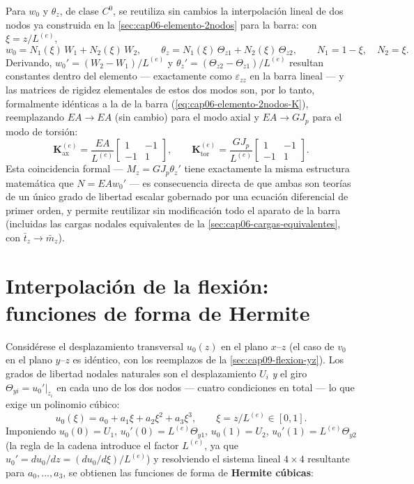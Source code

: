 Para $w_0$ y $\theta_z$, de clase $C^0$, se reutiliza sin cambios la interpolación lineal de dos nodos ya construida en la \cref{sec:cap06-elemento-2nodos} para la barra: con $\xi=z/L^{(e)}$,
\[
w_0 = N_1(\xi)\,W_1 + N_2(\xi)\,W_2, \qquad \theta_z = N_1(\xi)\,\Theta_{z1} + N_2(\xi)\,\Theta_{z2}, \qquad N_1=1-\xi,\quad N_2=\xi .
\]
Derivando, $w_0'=(W_2-W_1)/L^{(e)}$ y $\theta_z'=(\Theta_{z2}-\Theta_{z1})/L^{(e)}$ resultan constantes dentro del elemento --- exactamente como $\varepsilon_{zz}$ en la barra lineal --- y las matrices de rigidez elementales de estos dos modos son, por lo tanto, formalmente idénticas a la de la barra (\cref{eq:cap06-elemento-2nodos-K}), reemplazando $EA\to EA$ (sin cambio) para el modo axial y $EA\to GJ_p$ para el modo de torsión:
\[
\bm K_{\text{ax}}^{(e)} = \frac{EA}{L^{(e)}}\begin{bmatrix}1&-1\\-1&1\end{bmatrix}, \qquad
\bm K_{\text{tor}}^{(e)} = \frac{GJ_p}{L^{(e)}}\begin{bmatrix}1&-1\\-1&1\end{bmatrix} .
\]
Esta coincidencia formal --- $M_z=GJ_p\theta_z'$ tiene exactamente la misma estructura matemática que $N=EAw_0'$ --- es consecuencia directa de que ambas son teorías de un único grado de libertad escalar gobernado por una ecuación diferencial de primer orden, y permite reutilizar sin modificación todo el aparato de la barra (incluidas las cargas nodales equivalentes de la \cref{sec:cap06-cargas-equivalentes}, con $\bar t_z\to\bar m_z$).

\section{Interpolación de la flexión: funciones de forma de Hermite}
\label{sec:cap10-interpolacion-flexion}

Considérese el desplazamiento transversal $u_0(z)$ en el plano $x$--$z$ (el caso de $v_0$ en el plano $y$--$z$ es idéntico, con los reemplazos de la \cref{sec:cap09-flexion-yz}). Los grados de libertad nodales naturales son el desplazamiento $U_i$ \emph{y} el giro $\Theta_{yi}=u_0'|_{z_i}$ en cada uno de los dos nodos --- cuatro condiciones en total --- lo que exige un polinomio cúbico:
\[
u_0(\xi) = a_0+a_1\xi+a_2\xi^2+a_3\xi^3, \qquad \xi=z/L^{(e)}\in[0,1] .
\]
Imponiendo $u_0(0)=U_1$, $u_0'(0)=L^{(e)}\Theta_{y1}$, $u_0(1)=U_2$, $u_0'(1)=L^{(e)}\Theta_{y2}$ (la regla de la cadena introduce el factor $L^{(e)}$, ya que $u_0'=du_0/dz=(du_0/d\xi)/L^{(e)}$) y resolviendo el sistema lineal $4\times4$ resultante para $a_0,\dots,a_3$, se obtienen las funciones de forma de \textbf{Hermite cúbicas}:

